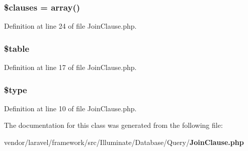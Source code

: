 \subsubsection[{\$clauses}]{\setlength{\rightskip}{0pt plus 5cm}\$clauses = array()}\label{class_illuminate_1_1_database_1_1_query_1_1_join_clause_a38189c4b49ebb5aa5e7155b42a5a2b5a}


Definition at line 24 of file Join\+Clause.\+php.

\subsubsection[{\$table}]{\setlength{\rightskip}{0pt plus 5cm}\$table}\label{class_illuminate_1_1_database_1_1_query_1_1_join_clause_ae8876a14058f368335baccf35af4a22b}


Definition at line 17 of file Join\+Clause.\+php.

\subsubsection[{\$type}]{\setlength{\rightskip}{0pt plus 5cm}\$type}\label{class_illuminate_1_1_database_1_1_query_1_1_join_clause_a9a4a6fba2208984cabb3afacadf33919}


Definition at line 10 of file Join\+Clause.\+php.



The documentation for this class was generated from the following file\+:\begin{DoxyCompactItemize}
\item 
vendor/laravel/framework/src/\+Illuminate/\+Database/\+Query/{\bf Join\+Clause.\+php}\end{DoxyCompactItemize}
